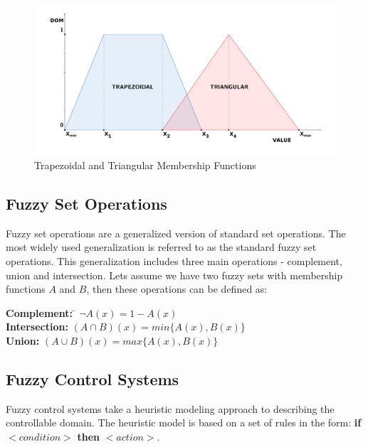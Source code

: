 \begin{figure}[h]
\centering
\includegraphics[scale=0.53]{2/figures/sample_sets.pdf}
\caption{Trapezoidal and Triangular Membership Functions}
\label{sample_fuzzy_sets}
\end{figure}

\subsection{Fuzzy Set Operations}

Fuzzy set operations \cite{fuzzy_sets} are a generalized version of standard set operations. The most widely used generalization is referred to as the standard fuzzy set operations. This generalization includes three main operations - complement, union and intersection. Lets assume we have two fuzzy sets with membership functions $A$ and $B$, then these operations can be defined as: 

\begin{tabbing}
\textbf{Complement:}\hspace{1em} \= $\neg A(x) = 1 - A(x)$\\
\textbf{Intersection:}\hspace{1em} \> $(A \cap B)(x) = min\{A(x), B(x)\}$\\
\textbf{Union:}\hspace{1em} \> $(A \cup B)(x) = max\{A(x), B(x)\}$\\
\end{tabbing}

\subsection{Fuzzy Control Systems}

Fuzzy control systems \cite{fuzzy_control_introduction} take a heuristic modeling approach to describing the controllable domain. The heuristic model is based on a set of rules in the form: \textbf{if} $<condition>$ \textbf{then} $<action>$. 

